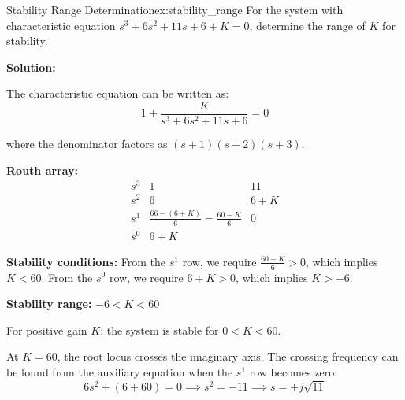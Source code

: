 \begin{example}{Stability Range Determination}{ex:stability_range}
For the system with characteristic equation $s^3 + 6s^2 + 11s + 6 + K = 0$, determine the range of $K$ for stability.

\textbf{Solution:}

The characteristic equation can be written as:
\[
1 + \frac{K}{s^3 + 6s^2 + 11s + 6} = 0
\]

where the denominator factors as $(s+1)(s+2)(s+3)$.

\textbf{Routh array:}
\[
\begin{array}{c|cc}
s^3 & 1 & 11 \\
s^2 & 6 & 6+K \\
s^1 & \frac{66 - (6+K)}{6} = \frac{60-K}{6} & 0 \\
s^0 & 6+K &
\end{array}
\]

\textbf{Stability conditions:} From the $s^1$ row, we require $\frac{60-K}{6} > 0$, which implies $K < 60$. From the $s^0$ row, we require $6 + K > 0$, which implies $K > -6$.

\textbf{Stability range:} $-6 < K < 60$

For positive gain $K$: the system is stable for $0 < K < 60$.

At $K = 60$, the root locus crosses the imaginary axis. The crossing frequency can be found from the auxiliary equation when the $s^1$ row becomes zero:
\[
6s^2 + (6 + 60) = 0 \implies s^2 = -11 \implies s = \pm j\sqrt{11}
\]
\end{example}

